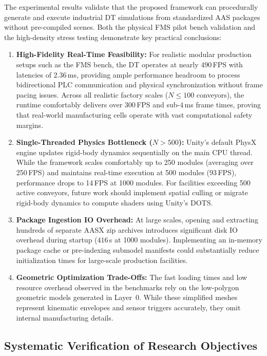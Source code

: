 The experimental results validate that the proposed framework can procedurally generate and execute industrial \gls{DT} simulations from standardized \gls{AAS} packages without pre-compiled scenes. Both the physical \gls{FMS} pilot bench validation and the high-density stress testing demonstrate key practical conclusions:

\begin{enumerate}
    \item \textbf{High-Fidelity Real-Time Feasibility:} For realistic modular production setups such as the \gls{FMS} bench, the \gls{DT} operates at nearly $490\,$\gls{FPS} with latencies of $2.36\,$ms, providing ample performance headroom to process bidirectional \gls{PLC} communication and physical synchronization without frame pacing issues. Across all realistic factory scales ($N \le 100$ conveyors), the runtime comfortably delivers over $300\,$\gls{FPS} and sub-$4\,$ms frame times, proving that real-world manufacturing cells operate with vast computational safety margins.
    \item \textbf{Single-Threaded Physics Bottleneck ($N > 500$):} Unity's default PhysX engine updates rigid-body dynamics sequentially on the main \gls{CPU} thread. While the framework scales comfortably up to 250 modules (averaging over 250\,\gls{FPS}) and maintains real-time execution at 500 modules (93\,\gls{FPS}), performance drops to 14\,\gls{FPS} at 1000 modules. For facilities exceeding 500 active conveyors, future work should implement spatial culling or migrate rigid-body dynamics to compute shaders using Unity's \gls{DOTS}.
    \item \textbf{Package Ingestion \gls{IO} Overhead:} At large scales, opening and extracting hundreds of separate \gls{AASX} zip archives introduces significant disk \gls{IO} overhead during startup ($416\,$s at 1000 modules). Implementing an in-memory package cache or pre-indexing submodel manifests could substantially reduce initialization times for large-scale production facilities.
    \item \textbf{Geometric Optimization Trade-Offs:} The fast loading times and low resource overhead observed in the benchmarks rely on the low-polygon geometric models generated in Layer~0. While these simplified meshes represent kinematic envelopes and sensor triggers accurately, they omit internal manufacturing details.
\end{enumerate}

\subsection{Systematic Verification of Research Objectives}

